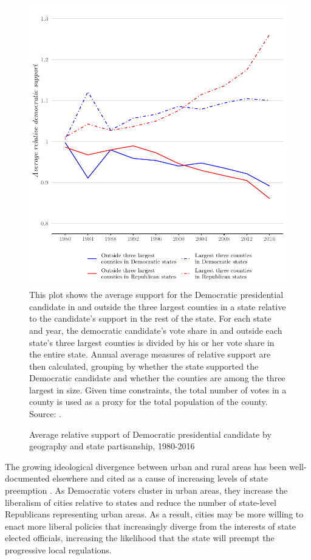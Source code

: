 \documentclass[12pt]{article}
\begin{document}
\begin{figure}[ht]
\caption{Average relative support of Democratic presidential candidate by geography and state partisanship, 1980-2016}
\label{fig:ideology}
\centering
\includegraphics[width=.75\textwidth]{plots/county_support}
\newline\scriptsize{This plot shows the average support for the Democratic presidential candidate in and outside the three largest counties in a state relative to the candidate's support in the rest of the state. For each state and year, the democratic candidate's vote share in and outside each state's three largest counties is divided by his or her vote share in the entire state. Annual average measures of relative support are then calculated, grouping by whether the state supported the Democratic candidate and whether the counties are among the three largest in size. Given time constraints, the total number of votes in a county is used as a proxy for the total population of the county. Source: \textcite{cqpressCQVotingElections2019}.}
\end{figure}

The growing ideological divergence between urban and rural areas has been well-documented elsewhere \parencite[e.g.][]{chenUnintentionalGerrymanderingPolitical2013} and cited as a cause of increasing levels of state preemption \parencite{dupuisCityRightsEra2018,hicksHomeRuleBe2018}. As Democratic voters cluster in urban areas, they increase the liberalism of cities relative to states and reduce the number of state-level Republicans representing urban areas. As a result, cities may be more willing to enact more liberal policies that increasingly diverge from the interests of state elected officials, increasing the likelihood that the state will preempt the progressive local regulations. 
\end{document}
